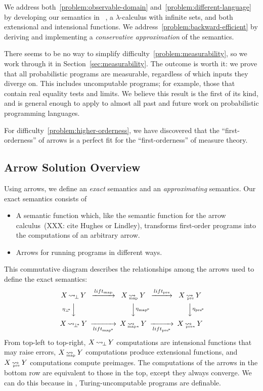 \documentclass[preprint]{sigplanconf}
\newcommand{\arrow}{\rightsquigarrow}
\newcommand{\arrowlift}{\ensuremath{lift}}
\DeclareMathOperator{\botto}{\arrow_{\mspace{-3mu}\bot}}
\newcommand{\map}{_\mathrm{map}}
\DeclareMathOperator{\mapto}{\arrow_{\mspace{-21mu}\map}}
\newcommand{\liftmap}{\arrowlift\map}
\newcommand{\pre}{_\mathrm{pre}}
\DeclareMathOperator{\preto}{\arrow_{\mspace{-19mu}\pre}}
\newcommand{\liftpre}{\arrowlift\pre}
\newcommand{\pbot}{{\bot^{\mspace{-4mu}*}}}
\DeclareMathOperator{\pbotto}{\arrow_{\mspace{-3mu}\pbot}}
\newcommand{\pmap}{_\mathrm{map^{\mspace{-2mu}*}}}
\DeclareMathOperator{\pmapto}{\arrow_{\mspace{-22mu}_{\mathrm{map*}}}}
\newcommand{\liftpmap}{\arrowlift\pmap}
\newcommand{\ppre}{_\mathrm{pre^{\mspace{-2mu}*}}}
\DeclareMathOperator{\ppreto}{\arrow_{\mspace{-19mu}_{\mathrm{pre*}}}}
\newcommand{\liftppre}{\arrowlift\ppre}
\begin{document}
We address both~\ref{problem:observable-domain} and~\ref{problem:different-language} by developing our semantics in \lzfclang~\cite{cit:toronto-2012flops-lzfc}, a $\lambda$-calculus with infinite sets, and both extensional and intensional functions.
We address~\ref{problem:backward-efficient} by deriving and implementing a \emph{conservative approximation} of the semantics.

There seems to be no way to simplify difficulty~\ref{problem:measurability}, so we work through it in Section~\ref{sec:measurability}.
The outcome is worth it: we prove that all probabilistic programs are measurable, regardless of which inputs they diverge on.
This includes uncomputable programs; for example, those that contain real equality tests and limits.
We believe this result is the first of its kind, and is general enough to apply to almost all past and future work on probabilistic programming languages.

For difficulty~\ref{problem:higher-orderness}, we have discovered that the ``first-orderness'' of arrows is a perfect fit for the ``first-orderness'' of measure theory.

\subsection{Arrow Solution Overview}

Using arrows, we define an \emph{exact} semantics and an \emph{approximating} semantics.
Our exact semantics consists of
\begin{itemize}
	\item A semantic function which, like the semantic function for the arrow calculus~(XXX: cite Hughes or Lindley), transforms first-order programs into the computations of an arbitrary arrow.
	\item Arrows for running programs in different ways.
\end{itemize}
This commutative diagram describes the relationships among the arrows used to define the exact semantics:
\begin{equation}
\begin{CD}
X \botto Y   @>\liftmap>>   X \mapto Y   @>\liftpre>>   X \preto Y \\
@V{\eta_\pbot}VV             @VV{\eta\pmap}V              @VV{\eta\ppre}V\\
X \pbotto Y  @>>\liftpmap>  X \pmapto Y  @>>\liftppre>  X \ppreto Y
\end{CD}
\label{eqn:roadmap-diagram}
\end{equation}
From top-left to top-right, $X \botto Y$ computations are intensional functions that may raise errors, $X \mapto Y$ computations produce extensional functions, and $X \preto Y$ computations compute preimages.
The computations of the arrows in the bottom row are equivalent to those in the top, except they always converge.
We can do this because in \lzfclang, Turing-uncomputable programs are definable.
\end{document}
